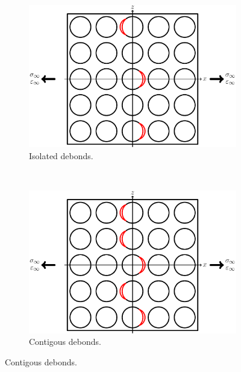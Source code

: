 \begin{figure}[!h]
\centering
    \begin{subfigure}[b]{0.45\textwidth}
        \includegraphics[width=\textwidth]{pics/stage1-isolateddebonds.pdf}
       \caption{Isolated debonds.}
    \end{subfigure}
    ~
    \begin{subfigure}[b]{0.45\textwidth}
        \includegraphics[width=\textwidth]{pics/stage2-critdebonds.pdf}
       \caption{Contigous debonds.}
    \end{subfigure}


\end{figure}
